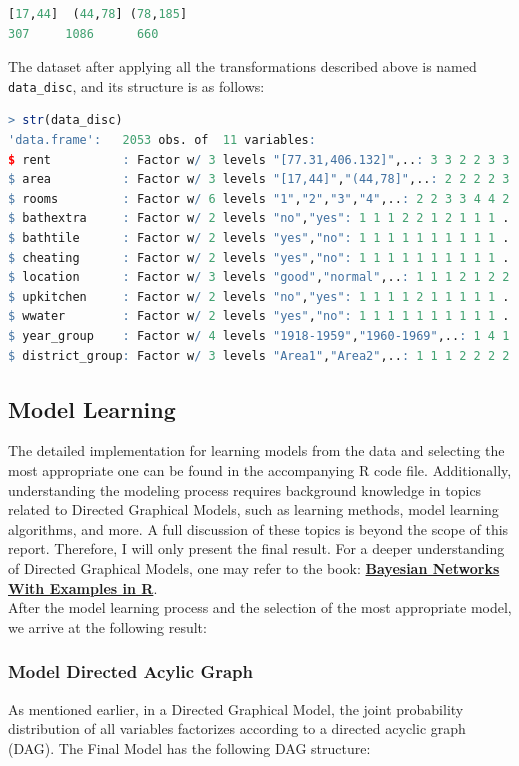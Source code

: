 \documentclass[15pt,a4paper]{report}
\begin{document}
\begin{itemize}
\begin{lstlisting}[language=R]
[17,44]  (44,78] (78,185] 
307     1086      660 
\end{lstlisting}
The dataset after applying all the transformations described above is named \lstinline[language=R]|data_disc|, and its structure is as follows:
\begin{lstlisting}[language=R]
> str(data_disc)
'data.frame':	2053 obs. of  11 variables:
$ rent          : Factor w/ 3 levels "[77.31,406.132]",..: 3 3 2 2 3 3 1 2 2 1 ...
$ area          : Factor w/ 3 levels "[17,44]","(44,78]",..: 2 2 2 2 3 3 2 3 2 2 ...
$ rooms         : Factor w/ 6 levels "1","2","3","4",..: 2 2 3 3 4 4 2 3 1 3 ...
$ bathextra     : Factor w/ 2 levels "no","yes": 1 1 1 2 2 1 2 1 1 1 ...
$ bathtile      : Factor w/ 2 levels "yes","no": 1 1 1 1 1 1 1 1 1 1 ...
$ cheating      : Factor w/ 2 levels "yes","no": 1 1 1 1 1 1 1 1 1 1 ...
$ location      : Factor w/ 3 levels "good","normal",..: 1 1 1 2 1 2 2 2 2 2 ...
$ upkitchen     : Factor w/ 2 levels "no","yes": 1 1 1 1 2 1 1 1 1 1 ...
$ wwater        : Factor w/ 2 levels "yes","no": 1 1 1 1 1 1 1 1 1 1 ...
$ year_group    : Factor w/ 4 levels "1918-1959","1960-1969",..: 1 4 1 3 4 3 1 1 1 1 ...
$ district_group: Factor w/ 3 levels "Area1","Area2",..: 1 1 1 2 2 2 2 2 2 2 ...
\end{lstlisting}
\end{itemize}
\subsection*{Model Learning}
The detailed implementation for learning models from the data and selecting the most appropriate one can be found in the accompanying R code file. Additionally, understanding the modeling process requires background knowledge in topics related to Directed Graphical Models, such as learning methods, model learning algorithms, and more. A full discussion of these topics is beyond the scope of this report. Therefore, I will only present the final result.
For a deeper understanding of Directed Graphical Models, one may refer to the book: \textbf{\href{https://www.bnlearn.com/book-crc-2ed/}{Bayesian Networks With Examples in R}}.\\

After the model learning process and the selection of the most appropriate model, we arrive at the following result:
\subsubsection*{Model Directed Acylic Graph}
As mentioned earlier, in a Directed Graphical Model, the joint probability distribution of all variables factorizes according to a directed acyclic graph (DAG). The Final Model has the following DAG structure:
\end{document}
